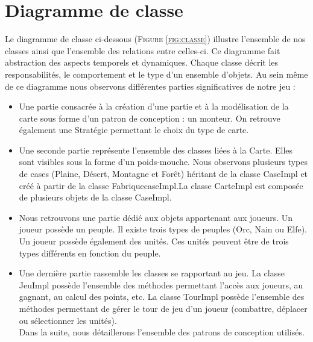 \documentclass[a4paper,11pt]{article}
\begin{document}
\section{Diagramme de classe}
	\vspace*{0.5cm}
	Le diagramme de classe ci-dessous  (\textsc{Figure \ref{fig:classe}})  illustre l’ensemble de nos classes ainsi que l’ensemble des relations entre celles-ci. Ce diagramme fait abstraction des aspects temporels et dynamiques. Chaque classe décrit les responsabilités, le comportement et le type d’un ensemble d’objets. Au sein même de ce diagramme nous observons différentes parties significatives de notre jeu : 
	\begin{itemize}
\item Une partie consacrée à la création d’une partie et à la modélisation de la carte sous forme d’un patron de conception : un monteur. On retrouve également une Stratégie permettant le choix du type de carte.
\item	Une seconde partie représente  l’ensemble des classes liées à la Carte. Elles sont visibles sous la forme d’un poids-mouche. Nous observons plusieurs types de cases (Plaine, Désert, Montagne et Forêt) héritant de la classe CaseImpl et créé à partir de la classe FabriquecaseImpl.La classe CarteImpl est composée de plusieurs objets de la classe CaseImpl.
\item	Nous retrouvons une partie dédié aux objets appartenant aux joueurs. Un joueur possède un peuple. Il existe trois types de peuples (Orc, Nain ou Elfe). Un joueur possède également des unités. Ces unités peuvent être de trois types différents en fonction du peuple.
\item	Une dernière partie rassemble les classes se rapportant au jeu. La classe JeuImpl  possède l’ensemble des méthodes permettant l’accès aux joueurs, au gagnant, au calcul des points, etc. La classe TourImpl possède l’ensemble des méthodes permettant de gérer le tour de jeu d’un joueur (combattre, déplacer ou sélectionner les unités). \\

Dans la suite, nous détaillerons l’ensemble des patrons de conception utilisés.
\end{itemize}
\end{document}
